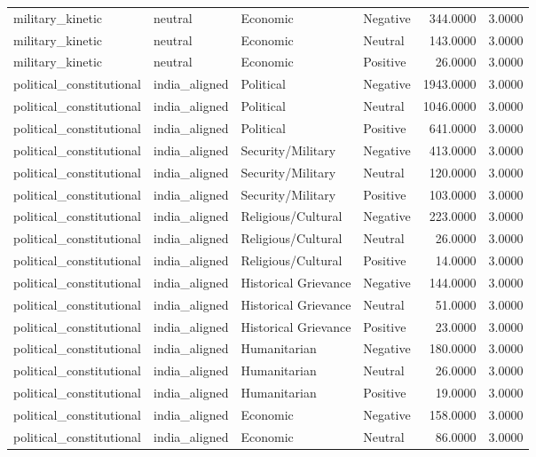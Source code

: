 \begin{longtable}{llllrr}
military\_kinetic & neutral & Economic & Negative & 344.0000 & 3.0000 \\
military\_kinetic & neutral & Economic & Neutral & 143.0000 & 3.0000 \\
military\_kinetic & neutral & Economic & Positive & 26.0000 & 3.0000 \\
political\_constitutional & india\_aligned & Political & Negative & 1943.0000 & 3.0000 \\
political\_constitutional & india\_aligned & Political & Neutral & 1046.0000 & 3.0000 \\
political\_constitutional & india\_aligned & Political & Positive & 641.0000 & 3.0000 \\
political\_constitutional & india\_aligned & Security/Military & Negative & 413.0000 & 3.0000 \\
political\_constitutional & india\_aligned & Security/Military & Neutral & 120.0000 & 3.0000 \\
political\_constitutional & india\_aligned & Security/Military & Positive & 103.0000 & 3.0000 \\
political\_constitutional & india\_aligned & Religious/Cultural & Negative & 223.0000 & 3.0000 \\
political\_constitutional & india\_aligned & Religious/Cultural & Neutral & 26.0000 & 3.0000 \\
political\_constitutional & india\_aligned & Religious/Cultural & Positive & 14.0000 & 3.0000 \\
political\_constitutional & india\_aligned & Historical Grievance & Negative & 144.0000 & 3.0000 \\
political\_constitutional & india\_aligned & Historical Grievance & Neutral & 51.0000 & 3.0000 \\
political\_constitutional & india\_aligned & Historical Grievance & Positive & 23.0000 & 3.0000 \\
political\_constitutional & india\_aligned & Humanitarian & Negative & 180.0000 & 3.0000 \\
political\_constitutional & india\_aligned & Humanitarian & Neutral & 26.0000 & 3.0000 \\
political\_constitutional & india\_aligned & Humanitarian & Positive & 19.0000 & 3.0000 \\
political\_constitutional & india\_aligned & Economic & Negative & 158.0000 & 3.0000 \\
political\_constitutional & india\_aligned & Economic & Neutral & 86.0000 & 3.0000 \\

\end{longtable}

